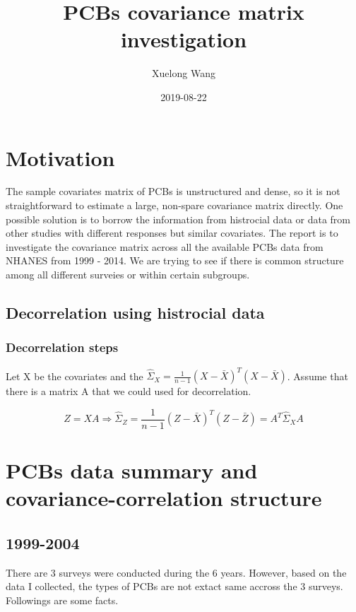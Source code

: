 \documentclass[]{article}
\title{PCBs covariance matrix investigation}
\author{Xuelong Wang}
\date{2019-08-22}
\begin{document}
\maketitle

{
\setcounter{tocdepth}{2}
\tableofcontents
}
\section{Motivation}\label{motivation}

The sample covariates matrix of PCBs is unstructured and dense, so it is
not straightforward to estimate a large, non-spare covariance matrix
directly. One possible solution is to borrow the information from
histrocial data or data from other studies with different responses but
similar covariates. The report is to investigate the covariance matrix
across all the available PCBs data from NHANES from 1999 - 2014. We are
trying to see if there is common structure among all different surveies
or within certain subgroups.

\subsection{Decorrelation using histrocial
data}\label{decorrelation-using-histrocial-data}

\subsubsection{Decorrelation steps}\label{decorrelation-steps}

Let X be the covariates and the
\(\hat{\Sigma}_X = \frac{1}{n-1}(X - \bar{X})^T(X - \bar{X})\). Assume
that there is a matrix A that we could used for decorrelation.

\[
Z = XA \Rightarrow \hat{\Sigma}_Z = \frac{1}{n-1} (Z - \bar{X})^T(Z - \bar{Z}) =  A^T\hat{\Sigma}_XA
\]

\section{PCBs data summary and covariance-correlation
structure}\label{pcbs-data-summary-and-covariance-correlation-structure}

\subsection{1999-2004}\label{section}

There are 3 surveys were conducted during the 6 years. However, based on
the data I collected, the types of PCBs are not extact same accross the
3 surveys. Followings are some facts.
\end{document}
